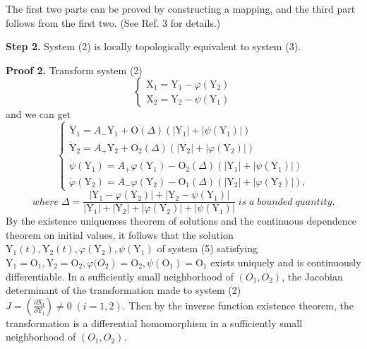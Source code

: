 \documentclass[11pt]{diazessay} %
\begin{document}
\noindent
The first two parts can be proved by constructing a mapping, and the third part follows from the first two. (See Ref. 3 for details.)

\vskip 8pt
\textbf{Step 2. }System (2) is locally topologically equivalent to system (3).

\vskip 8pt
\textbf{Proof 2. }
Transform system (2)
$$
\left\{\begin{array}{l}
\mathrm{X}_1=\mathrm{Y}_1-\varphi\left(\mathrm{Y}_2\right) \\
\mathrm{X}_2=\mathrm{Y}_2-\psi\left(\mathrm{Y}_1\right)
\end{array}\right.
$$
and we can get
\begin{equation}
	\left\{\begin{array}{l}
	\dot{\mathrm{Y}}_1=A_{-} \mathrm{Y}_1+\mathrm{O}(\Delta)\left(\left|\mathrm{Y}_1\right|+\left|{\psi}\left(\mathrm{Y}_1\right)\right|\right) \\
	\dot{\mathrm{Y}}_2=A_{+} \mathrm{Y}_2+\mathrm{O}_2(\Delta)\left(\left|\mathrm{Y}_2\right|+\left|{\varphi}\left(\mathrm{Y}_2\right)\right|\right) \\
	\dot{{\psi}}\left(\mathrm{Y}_1\right)=A_{+} {\varphi}\left(\mathrm{Y}_1\right)-\mathrm{O}_2(\Delta)\left(\left|\mathrm{Y}_1\right|+\left|{\psi}\left(\mathrm{Y}_1\right)\right|\right) \\
	\dot{{\varphi}}\left(\mathrm{Y}_2\right)=A_{-} {\varphi}\left(\mathrm{Y}_2\right)-\mathrm{O}_1(\Delta)\left(\left|\mathrm{Y}_2\right|+\left|\varphi\left(\mathrm{Y}_2\right)\right|\right),
	\end{array}\right.
\end{equation}
$$
where\; \Delta=\frac{\left|\mathrm{Y}_1-{\varphi}\left(\mathrm{Y}_2\right)\right|+\left|\mathrm{Y}_2-\psi\left(\mathrm{Y}_1\right)\right|}{\left|\mathrm{Y}_1\right|+\left|\mathrm{Y}_2\right|+\left|\varphi\left(\mathrm{Y}_2\right)\right|+\left|\psi\left(\mathrm{Y}_1\right)\right|} \;is\; a\; bounded\; quantity.
$$
By the existence uniqueness theorem of solutions and the continuous dependence theorem on initial values, it follows that the solution $\mathrm{Y}_1(t), \mathrm{Y}_2(t), {\varphi}\left(\mathrm{Y}_2\right), {\psi}\left(\mathrm{Y}_1\right)$ of system (5) satisfying $\left.\mathrm{Y}_1=\mathrm{O}_1,  \mathrm{Y}_2=\mathrm{O}_2,  \varphi{( O _ { 2 }}\right)=\mathrm{O}_2,  \psi\left(\mathrm{O}_1\right)=\mathrm{O}_1$ exists uniquely and is continuously differentiable.
In a sufficiently small neighborhood of $(O_1,O_2)$, the Jacobian determinant of the transformation made to system (2) $ J=\left(\frac{\partial \mathrm{X}_{\mathrm{i}}}{\partial \mathrm{Y}_{\mathrm{i}}}\right)\neq 0\; (i=1,2). $
Then by the inverse function existence theorem, the transformation is a differential homomorphism in a sufficiently small neighborhood of $(O_1,O_2)$.
\end{document}
